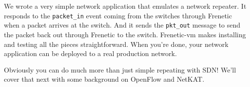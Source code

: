 We wrote a very simple network application that emulates a network repeater.   
It responds to the \lstinline{packet_in} event coming from the switches through Frenetic when a packet 
arrives at the switch.  
And it sends the \lstinline{pkt_out} message to send the packet back out through Frenetic to the switch.  
Frenetic-vm makes installing and testing all the pieces straightforward. 
When you're done, your network application can be deployed to a real production network.

Obviously you can do much more than just simple repeating with SDN!  
We'll cover that next with some background on OpenFlow and NetKAT.  